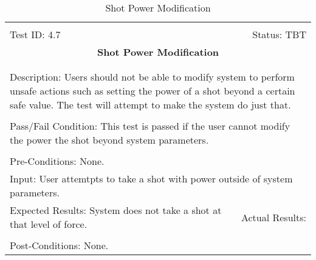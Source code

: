 \documentclass[titlepage]{article}
\begin{document}
\begin{center}%
\begin{table}
\begin{tabular}{|l r|}\hline&\\[-2mm]
	Test ID: 4.7	&Status: TBT\\[-3mm]
	\multicolumn{2}{|c|}{\textbf{\large{Shot Power Modification}}}\\&\\\hline&\\[-3mm]
	\multicolumn{2}{|p{\textwidth}|}{Description: Users should not be able to modify system to perform unsafe actions such as setting the power of a shot beyond a certain safe value. The test will attempt to make the system do just that.}\\[1mm]\hline&\\[-3mm]
	\multicolumn{2}{|p{\textwidth}|}{Pass/Fail Condition: This test is passed if the user cannot modify the power the shot beyond system parameters.}\\[1mm]\hline&\\[-3mm]
	\multicolumn{2}{|p{\textwidth}|}{Pre-Conditions: None.}\\[4mm]
	\multicolumn{2}{|p{\textwidth}|}{Input: User attemtpts to take a shot with power outside of system parameters.}\\[2mm]\hline
	\multicolumn{1}{|p{0.49\textwidth}}{Expected Results: System does not take a shot at that level of force.}	&\multicolumn{1}{|p{0.45\textwidth}|}{Actual Results:}\\\hline&\\[-3mm]
	\multicolumn{2}{|p{\textwidth}|}{Post-Conditions: None.}\\\hline
\end{tabular}
\caption{Shot Power Modification}
\end{table}
\end{center}
\end{document}
